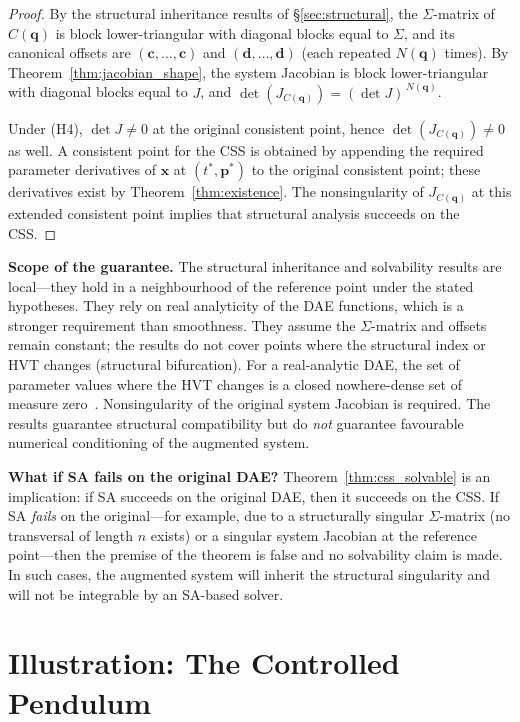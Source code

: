 \documentclass[12pt,a4paper]{article}
\theoremstyle{definition}
\theoremstyle{plain}
\theoremstyle{remark}
\newcommand{\vx}{\mathbf{x}}
\newcommand{\vp}{\mathbf{p}}
\newcommand{\vq}{\mathbf{q}}
\newcommand{\vc}{\mathbf{c}}
\newcommand{\vd}{\mathbf{d}}
\begin{document}
\begin{proof}
By the structural inheritance results of \S\ref{sec:structural}, the $\Sigma$-matrix of $C(\vq)$ is block lower-triangular with diagonal blocks equal to $\Sigma$, and its canonical offsets are $(\vc,\dots,\vc)$ and $(\vd,\dots,\vd)$ (each repeated $N(\vq)$ times). By Theorem~\ref{thm:jacobian_shape}, the system Jacobian is block lower-triangular with diagonal blocks equal to $J$, and $\det(J_{C(\vq)}) = (\det J)^{\,N(\vq)}$.

Under (H4), $\det J \neq 0$ at the original consistent point, hence $\det(J_{C(\vq)}) \neq 0$ as well. A consistent point for the CSS is obtained by appending the required parameter derivatives of $\vx$ at $(t^*,\vp^*)$ to the original consistent point; these derivatives exist by Theorem~\ref{thm:existence}. The nonsingularity of $J_{C(\vq)}$ at this extended consistent point implies that structural analysis succeeds on the CSS.
\end{proof}

\smallskip\noindent
\textbf{Scope of the guarantee.} The structural inheritance and solvability results are local---they hold in a neighbourhood of the reference point under the stated hypotheses. They rely on real analyticity of the DAE functions, which is a stronger requirement than smoothness. They assume the $\Sigma$-matrix and offsets remain constant; the results do not cover points where the structural index or HVT changes (structural bifurcation). For a real-analytic DAE, the set of parameter values where the HVT changes is a closed nowhere-dense set of measure zero~\cite{nedialkov2008solving}. Nonsingularity of the original system Jacobian is required. The results guarantee structural compatibility but do \emph{not} guarantee favourable numerical conditioning of the augmented system.

\smallskip\noindent
\textbf{What if SA fails on the original DAE?} Theorem~\ref{thm:css_solvable} is an implication: if SA succeeds on the original DAE, then it succeeds on the CSS. If SA \emph{fails} on the original---for example, due to a structurally singular $\Sigma$-matrix (no transversal of length $n$ exists) or a singular system Jacobian at the reference point---then the premise of the theorem is false and no solvability claim is made. In such cases, the augmented system will inherit the structural singularity and will not be integrable by an SA-based solver.

\section{Illustration: The Controlled Pendulum}
\end{document}
